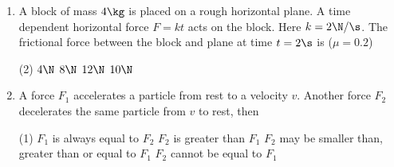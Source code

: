 \documentclass{article}
\begin{document}
\begin{enumerate}
\item A block of mass $4 \kg$ is placed on a rough horizontal plane. A time dependent horizontal force $F = kt$ acts on the block. Here $k = 2 \N/\s$. The frictional force between the block and plane at
time $t = 2\s$ is ($\mu = 0.2$)
\begin{tasks}(2)
	\task $4\N$
	\task $8\N$\ans
	\task $12\N$
	\task $10\N$
\end{tasks}

\item A force $F_1$ accelerates a particle from rest to a velocity $v$. Another force $F_2$ decelerates the same particle from $v$ to rest, then
\begin{tasks}(1)
	\task $F_1$ is always equal to $F_2$\ans
	\task $F_2$ is greater than $F_1$
	\task $F_2$ may be smaller than, greater than or equal to $F_1$
	\task $F_2$ cannot be equal to $F_1$
\end{tasks}

\end{enumerate}



\jeeSectionB
\end{document}
